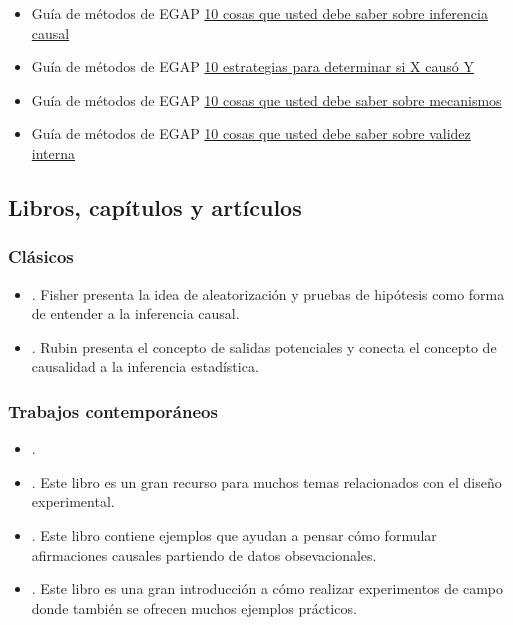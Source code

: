 \documentclass[12pt,spanish,]{book}
\begin{document}
\begin{itemize}
\item
  Guía de métodos de EGAP \href{https://egap.org/resource/10-things-to-know-about-causal-inference/}{10 cosas que usted debe saber sobre inferencia causal}
\item
  Guía de métodos de EGAP \href{https://egap.org/resource/10-strategies-figuring-out-if-x-caused-y/}{10 estrategias para determinar si X causó Y}
\item
  Guía de métodos de EGAP \href{https://egap.org/resource/10-things-mechanisms/}{10 cosas que usted debe saber sobre mecanismos}
\item
  Guía de métodos de EGAP \href{https://egap.org/resource/10-things-to-know-about-external-validity/}{10 cosas que usted debe saber sobre validez interna}
\end{itemize}

\hypertarget{causalinference-cites}{%
\subsection{Libros, capítulos y artículos}\label{causalinference-cites}}

\hypertarget{causalinference-classics}{%
\subsubsection{Clásicos}\label{causalinference-classics}}

\begin{itemize}
\item
  \autocite{fisher_design_1935}. Fisher presenta la idea de aleatorización y pruebas de hipótesis como forma de entender a la inferencia causal.
\item
  \autocite{rubin:1974}. Rubin presenta el concepto de salidas potenciales y conecta el concepto de causalidad a la inferencia estadística.
\end{itemize}

\hypertarget{trabajos-contemporuxe1neos}{%
\subsubsection{Trabajos contemporáneos}\label{trabajos-contemporuxe1neos}}

\begin{itemize}
\item
  \autocite{brady2008causation}.
\item
  \autocite[Capítulo 1]{gerber_field_2012}. Este libro es un gran recurso para muchos temas relacionados con el diseño experimental.
\item
  \autocite[Capítulo 1]{morgan_counterfactuals_2007}. Este libro contiene ejemplos que ayudan a pensar cómo formular afirmaciones causales partiendo de datos obsevacionales.
\item
  \autocite{glennerster_running_2013}. Este libro es una gran introducción a cómo realizar experimentos de campo donde también se ofrecen muchos ejemplos prácticos.
\end{itemize}
\end{document}
